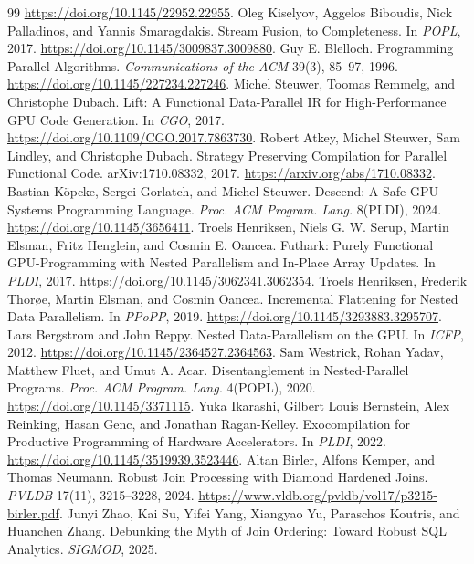 \begin{thebibliography}{99}
\url{https://doi.org/10.1145/22952.22955}.
 Oleg Kiselyov, Aggelos Biboudis,
Nick Palladinos, and Yannis Smaragdakis.
Stream Fusion, to Completeness.
In \emph{POPL}, 2017.
\url{https://doi.org/10.1145/3009837.3009880}.
 Guy E. Blelloch.
Programming Parallel Algorithms.
\emph{Communications of the ACM} 39(3), 85--97, 1996.
\url{https://doi.org/10.1145/227234.227246}.
 Michel Steuwer, Toomas Remmelg, and Christophe Dubach.
Lift: A Functional Data-Parallel IR for High-Performance GPU Code Generation.
In \emph{CGO}, 2017.
\url{https://doi.org/10.1109/CGO.2017.7863730}.
 Robert Atkey, Michel Steuwer, Sam Lindley, and Christophe Dubach.
Strategy Preserving Compilation for Parallel Functional Code.
arXiv:1710.08332, 2017.
\url{https://arxiv.org/abs/1710.08332}.
 Bastian K\"opcke, Sergei Gorlatch, and Michel Steuwer.
Descend: A Safe GPU Systems Programming Language.
\emph{Proc. ACM Program. Lang.} 8(PLDI), 2024.
\url{https://doi.org/10.1145/3656411}.
 Troels Henriksen, Niels G. W. Serup, Martin Elsman, Fritz Henglein, and Cosmin E. Oancea.
Futhark: Purely Functional GPU-Programming with Nested Parallelism and In-Place Array Updates.
In \emph{PLDI}, 2017.
\url{https://doi.org/10.1145/3062341.3062354}.
 Troels Henriksen, Frederik Thorøe, Martin Elsman, and Cosmin Oancea.
Incremental Flattening for Nested Data Parallelism.
In \emph{PPoPP}, 2019.
\url{https://doi.org/10.1145/3293883.3295707}.
 Lars Bergstrom and John Reppy.
Nested Data-Parallelism on the GPU.
In \emph{ICFP}, 2012.
\url{https://doi.org/10.1145/2364527.2364563}.
 Sam Westrick, Rohan Yadav, Matthew Fluet, and Umut A. Acar.
Disentanglement in Nested-Parallel Programs.
\emph{Proc. ACM Program. Lang.} 4(POPL), 2020.
\url{https://doi.org/10.1145/3371115}.
 Yuka Ikarashi, Gilbert Louis Bernstein, Alex Reinking, Hasan Genc, and Jonathan Ragan-Kelley.
Exocompilation for Productive Programming of Hardware Accelerators.
In \emph{PLDI}, 2022.
\url{https://doi.org/10.1145/3519939.3523446}.
 Altan Birler, Alfons Kemper, and Thomas Neumann.
Robust Join Processing with Diamond Hardened Joins.
\emph{PVLDB} 17(11), 3215--3228, 2024.
\url{https://www.vldb.org/pvldb/vol17/p3215-birler.pdf}.
 Junyi Zhao, Kai Su, Yifei Yang, Xiangyao Yu,
Paraschos Koutris, and Huanchen Zhang.
Debunking the Myth of Join Ordering: Toward Robust SQL Analytics.
\emph{SIGMOD}, 2025.

\end{thebibliography}

